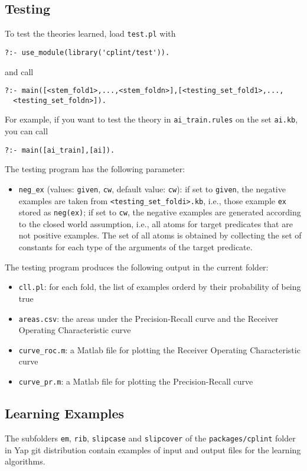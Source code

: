 \documentclass[a4paper,10pt]{scrartcl}
\begin{document}
\subsection{Testing}
To test the theories learned, load \texttt{test.pl} with 
\begin{verbatim}
?:- use_module(library('cplint/test')).
\end{verbatim}
and call
\begin{verbatim}
?:- main([<stem_fold1>,...,<stem_foldn>],[<testing_set_fold1>,...,
  <testing_set_foldn>]).
\end{verbatim}
For example, if you want to test the theory in \verb|ai_train.rules| on the set \verb|ai.kb|, you can call
\begin{verbatim}
?:- main([ai_train],[ai]).
\end{verbatim}
The testing program has the following parameter:
\begin{itemize}
\item \verb|neg_ex| (values:  \verb|given|, \verb|cw|, default value: \verb|cw|): if  set to \verb|given|, the negative examples
are taken from \verb|<testing_set_foldi>.kb|, i.e., those example \verb|ex| stored as \verb|neg(ex)|; if set to \verb|cw|, the negative examples are generated according to the closed world assumption, i.e., all atoms for target predicates that are not positive examples. The set of all atoms is obtained by collecting the set of constants for each type of the arguments of the target predicate.
\end{itemize}
The testing program produces the following output in the current folder:
\begin{itemize}
\item \verb|cll.pl|: for each fold, the list of examples orderd by their probability of being true
\item \verb|areas.csv|: the areas under the Precision-Recall curve and the Receiver Operating Characteristic curve
\item \verb|curve_roc.m|: a Matlab file for plotting the Receiver Operating Characteristic curve
\item \verb|curve_pr.m|: a Matlab file for plotting the Precision-Recall curve
\end{itemize}


\subsection{Learning Examples}
The subfolders \verb|em|, \verb|rib|, \verb|slipcase| and \verb|slipcover| of the \verb|packages/cplint| folder in Yap git distribution
contain examples of input and output files for the learning algorithms.
\end{document}
